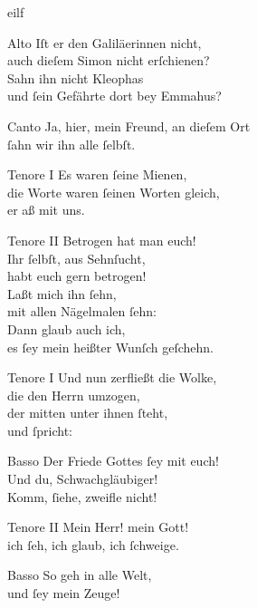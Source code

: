 \documentclass[tocstyle=ref-genre]{ees}
\begin{document}
{\begin{movement}{eilf}
  \item[Alto]
  Iſt er den Galiläerinnen nicht,\\
  auch dieſem Simon nicht erſchienen?\\
  Sahn ihn nicht Kleophas\\
  und ſein Gefährte dort bey Emmahus?

  \item[Canto]
  Ja, hier, mein Freund, an dieſem Ort\\
  ſahn wir ihn alle ſelbſt.

  \item[Tenore I]
  Es waren ſeine Mienen,\\
  die Worte waren ſeinen Worten gleich,\\
  er aß mit uns.

  \item[Tenore II]
  Betrogen hat man euch!\\
  Ihr ſelbſt, aus Sehnſucht,\\
  habt euch gern betrogen!\\
  Laßt mich ihn ſehn,\\
  mit allen Nägelmalen ſehn:\\
  Dann glaub auch ich,\\
  es ſey mein heißter Wunſch geſchehn.

  \item[Tenore I]
  Und nun zerfließt die Wolke,\\
  die den Herrn umzogen,\\
  der mitten unter ihnen ſteht,\\
  und ſpricht:

  \item[Basso]
  Der Friede Gottes ſey mit euch!\\
  Und du, Schwachgläubiger!\\
  Komm, ſiehe, zweifle nicht!

  \item[Tenore II]
  Mein Herr! mein Gott!\\
  ich ſeh, ich glaub, ich ſchweige.

  \item[Basso]
  So geh in alle Welt,\\
  und ſey mein Zeuge!
\end{movement}

}
\end{document}
